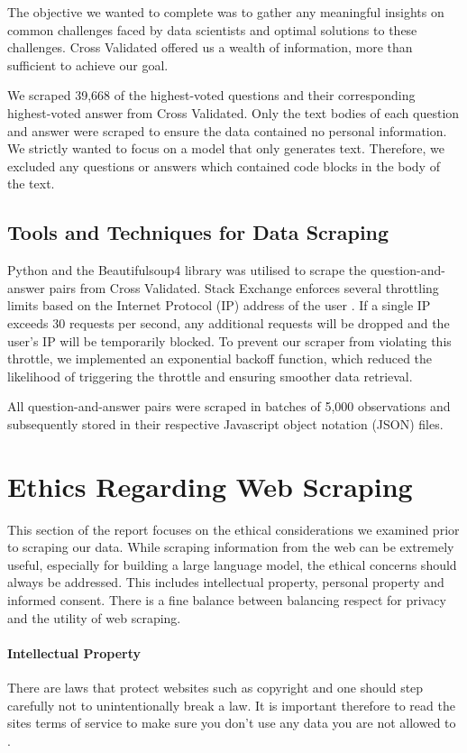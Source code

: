 \documentclass[10pt]{article}
\begin{document}
The objective we wanted to complete was to gather any meaningful insights on common challenges
faced by data scientists and optimal solutions to these challenges. Cross Validated offered us a wealth of
information, more than sufficient to achieve our goal.

We scraped 39,668 of the highest-voted questions and their corresponding highest-voted answer from Cross Validated.
Only the text bodies of each question and answer were scraped to ensure the data contained no personal information.
We strictly wanted to focus on a model that only generates text. Therefore, we excluded any questions or answers
which contained code blocks in the body of the text.

\subsection{Tools and Techniques for Data Scraping}

Python and the Beautifulsoup4 library \cite{beautifulsoup} was utilised to scrape the question-and-answer pairs
from Cross Validated. Stack Exchange enforces several throttling limits based on the Internet Protocol (IP)
address of the user \cite{stackexchange-throttle}. If a single IP exceeds 30 requests per second, 
any additional requests will be dropped and the user's IP will be temporarily blocked. To prevent our scraper from
violating this throttle, we implemented an exponential backoff function, which reduced the likelihood of
triggering the throttle and ensuring smoother data retrieval.

All question-and-answer pairs were scraped in batches of 5,000 observations and subsequently
stored in their respective Javascript object notation (JSON) files.

\section{Ethics Regarding Web Scraping}

This section of the report focuses on the ethical considerations we examined prior to scraping our data.
While scraping information from the web can be extremely useful, especially for building a large language
model, the ethical concerns should always be addressed. This includes intellectual property, personal
property and informed consent. There is a fine balance between balancing respect for privacy and the
utility of web scraping.

\paragraph{Intellectual Property}
There are laws that protect websites such as copyright and one should step carefully not to unintentionally
break a law. It is important therefore to read the sites terms of service to make
sure you don't use any data you are not allowed to \cite{stackexchange-terms}.
\end{document}
